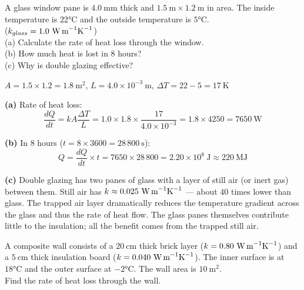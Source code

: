 \begin{examplebox}[16.1]
A glass window pane is $4.0\ \text{mm}$ thick and
$1.5\ \text{m} \times 1.2\ \text{m}$ in area. The
inside temperature is $22°\text{C}$ and the outside
temperature is $5°\text{C}$.\\
($k_{glass} = 1.0\ \text{W\,m}^{-1}\text{K}^{-1}$)\\
(a) Calculate the rate of heat loss through the
window.\\
(b) How much heat is lost in 8 hours?\\
(c) Why is double glazing effective?
\end{examplebox}

\begin{solutionbox}
$A = 1.5 \times 1.2 = 1.8\ \text{m}^2$,
$L = 4.0\times10^{-3}\ \text{m}$,
$\Delta T = 22 - 5 = 17\ \text{K}$

\textbf{(a)} Rate of heat loss:
\[
  \frac{dQ}{dt} = kA\frac{\Delta T}{L}
  = 1.0 \times 1.8 \times \frac{17}{4.0\times10^{-3}}
  = 1.8 \times 4250
  = 7650\ \text{W}
\]

\textbf{(b)} In 8 hours ($t = 8 \times 3600
= 28\,800\ \text{s}$):
\[
  Q = \frac{dQ}{dt} \times t
  = 7650 \times 28\,800
  = 2.20\times10^8\ \text{J} \approx 220\ \text{MJ}
\]

\textbf{(c)} Double glazing has two panes of glass
with a layer of still air (or inert gas) between them.
Still air has $k \approx 0.025\ \text{W\,m}^{-1}\text{K}^{-1}$
--- about 40 times lower than glass. The trapped air
layer dramatically reduces the temperature gradient
across the glass and thus the rate of heat flow.
The glass panes themselves contribute little to
the insulation; all the benefit comes from the
trapped still air.
\end{solutionbox}

\begin{examplebox}[16.2]
A composite wall consists of a $20\ \text{cm}$ thick
brick layer ($k = 0.80\ \text{W\,m}^{-1}\text{K}^{-1}$)
and a $5\ \text{cm}$ thick insulation board
($k = 0.040\ \text{W\,m}^{-1}\text{K}^{-1}$).
The inner surface is at $18°\text{C}$ and the outer
surface at $-2°\text{C}$. The wall area is $10\ \text{m}^2$.\\
Find the rate of heat loss through the wall.
\end{examplebox}


